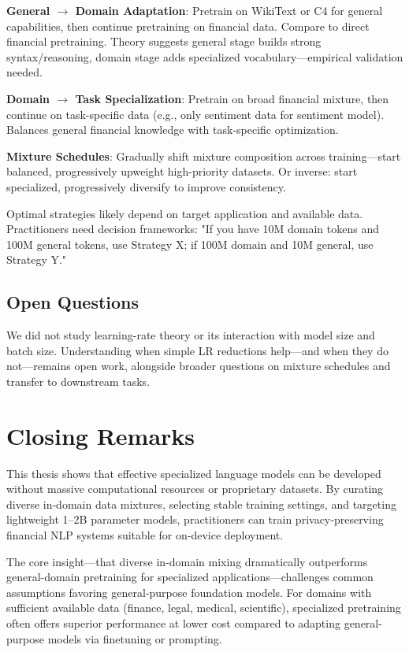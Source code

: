 \textbf{General $\rightarrow$ Domain Adaptation}: Pretrain on WikiText or C4 for general capabilities, then continue pretraining on financial data. Compare to direct financial pretraining. Theory suggests general stage builds strong syntax/reasoning, domain stage adds specialized vocabulary—empirical validation needed.

\textbf{Domain $\rightarrow$ Task Specialization}: Pretrain on broad financial mixture, then continue on task-specific data (e.g., only sentiment data for sentiment model). Balances general financial knowledge with task-specific optimization.

\textbf{Mixture Schedules}: Gradually shift mixture composition across training—start balanced, progressively upweight high-priority datasets. Or inverse: start specialized, progressively diversify to improve consistency.

Optimal strategies likely depend on target application and available data. Practitioners need decision frameworks: "If you have 10M domain tokens and 100M general tokens, use Strategy X; if 100M domain and 10M general, use Strategy Y."

\subsection{Open Questions}

We did not study learning-rate theory or its interaction with model size and batch size. Understanding when simple LR reductions help—and when they do not—remains open work, alongside broader questions on mixture schedules and transfer to downstream tasks.

\section{Closing Remarks}

This thesis shows that effective specialized language models can be developed without massive computational resources or proprietary datasets. By curating diverse in‑domain data mixtures, selecting stable training settings, and targeting lightweight 1–2B parameter models, practitioners can train privacy‑preserving financial NLP systems suitable for on‑device deployment.

The core insight—that diverse in-domain mixing dramatically outperforms general-domain pretraining for specialized applications—challenges common assumptions favoring general-purpose foundation models. For domains with sufficient available data (finance, legal, medical, scientific), specialized pretraining often offers superior performance at lower cost compared to adapting general-purpose models via finetuning or prompting.

